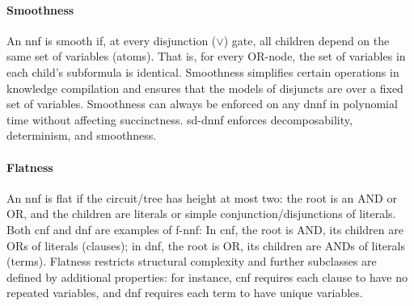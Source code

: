 \paragraph{Smoothness}
An \acrshort{nnf} is smooth if, at every disjunction ($\lor$) gate, all children depend on the same set of variables (atoms). That is, for every OR-node, the set of variables in each child's subformula is identical. Smoothness simplifies certain operations in knowledge compilation and ensures that the models of disjuncts are over a fixed set of variables. Smoothness can always be enforced on any \acrshort{dnnf} in polynomial time without affecting succinctness. \acrfull{sd-dnnf} enforces decomposability, determinism, and smoothness.

\paragraph{Flatness}
An \acrshort{nnf} is flat if the circuit/tree has height at most two: the root is an AND or OR, and the children are literals or simple conjunction/disjunctions of literals. Both \acrshort{cnf} and \acrshort{dnf} are examples of \acrfull{f-nnf}: In \acrshort{cnf}, the root is AND, its children are ORs of literals (clauses); in \acrshort{dnf}, the root is OR, its children are ANDs of literals (terms). Flatness restricts structural complexity and further subclasses are defined by additional properties: for instance, \acrshort{cnf} requires each clause to have no repeated variables, and \acrshort{dnf} requires each term to have unique variables.



